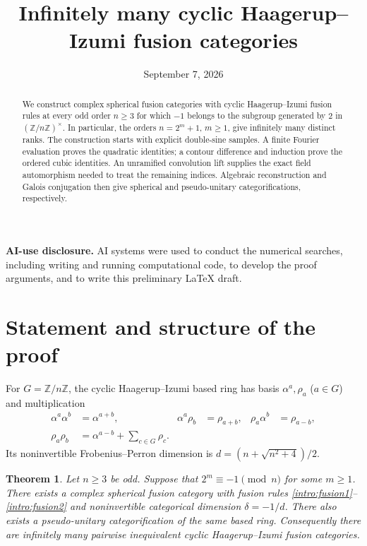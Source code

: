 \documentclass[11pt]{article}
\title{Infinitely many cyclic Haagerup--Izumi fusion categories}
\author{}
\date{September 7, 2026}
\numberwithin{equation}{section}
\newtheorem{theorem}{Theorem}[section]
\theoremstyle{definition}
\theoremstyle{remark}
\begin{document}
\maketitle
\begin{abstract}
We construct complex spherical fusion categories with cyclic
Haagerup--Izumi fusion rules at every odd order $n\geq3$ for which
$-1$ belongs to the subgroup generated by $2$ in $(\mathbb Z/n\mathbb Z)^\times$.
In particular, the orders $n=2^m+1$, $m\geq1$, give infinitely many
distinct ranks. The construction starts with explicit double-sine samples.
A finite Fourier evaluation proves the quadratic identities; a contour
difference and induction prove the ordered cubic identities. An unramified
convolution lift supplies the exact field automorphism needed to treat
the remaining indices. Algebraic reconstruction and Galois conjugation
then give spherical and pseudo-unitary categorifications, respectively.
\end{abstract}

\noindent\textbf{AI-use disclosure.}
AI systems were used to conduct the numerical searches, including writing
and running computational code, to develop the proof
arguments, and to write this preliminary \LaTeX{} draft.

\section{Statement and structure of the proof}

For $G=\mathbb Z/n\mathbb Z$, the cyclic Haagerup--Izumi based ring
has basis $\alpha^a,\rho_a$ ($a\in G$) and multiplication
\begin{align}
 \alpha^a\alpha^b&=\alpha^{a+b}, &
 \alpha^a\rho_b&=\rho_{a+b}, &
 \rho_a\alpha^b&=\rho_{a-b},\label{intro:fusion1}\\
 \rho_a\rho_b&=\alpha^{a-b}+\sum_{c\in G}\rho_c.
 \label{intro:fusion2}
\end{align}
Its noninvertible Frobenius--Perron dimension is
$d=(n+\sqrt{n^2+4})/2$.

\begin{theorem}\label{intro:main}
Let $n\geq3$ be odd. Suppose that $2^m\equiv-1\pmod n$ for some
$m\geq1$. There exists a complex spherical fusion category with fusion
rules \eqref{intro:fusion1}--\eqref{intro:fusion2} and noninvertible
categorical dimension $\delta=-1/d$. There also exists a pseudo-unitary
categorification of the same based ring. Consequently there are infinitely
many pairwise inequivalent cyclic Haagerup--Izumi fusion categories.
\end{theorem}
\end{document}
